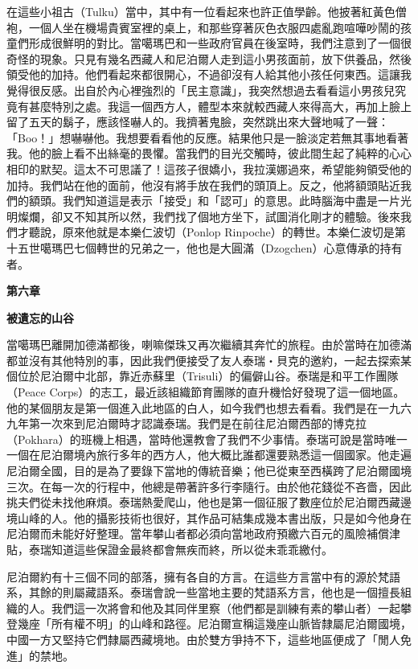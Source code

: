 在這些小祖古（Tulku）當中，其中有一位看起來也許正值學齡。他披著紅黃色僧袍，一個人坐在機場貴賓室裡的桌上，和那些穿著灰色衣服四處亂跑喧嘩吵鬧的孩童們形成很鮮明的對比。當噶瑪巴和一些政府官員在後室時，我們注意到了一個很奇怪的現象。只見有幾名西藏人和尼泊爾人走到這小男孩面前，放下供養品，然後領受他的加持。他們看起來都很開心，不過卻沒有人給其他小孩任何東西。這讓我覺得很反感。出自於內心裡強烈的「民主意識」，我突然想過去看看這小男孩兒究竟有甚麼特別之處。我這一個西方人，體型本來就較西藏人來得高大，再加上臉上留了五天的鬍子，應該怪嚇人的。我擠著鬼臉，突然跳出來大聲地喊了一聲：「Boo！」想嚇嚇他。我想要看看他的反應。結果他只是一臉淡定若無其事地看著我。他的臉上看不出絲毫的畏懼。當我們的目光交觸時，彼此間生起了純粹的心心相印的默契。這太不可思議了！這孩子很嬌小，我拉漢娜過來，希望能夠領受他的加持。我們站在他的面前，他沒有將手放在我們的頭頂上。反之，他將額頭貼近我們的額頭。我們知道這是表示「接受」和「認可」的意思。此時腦海中盡是一片光明燦爛，卻又不知其所以然，我們找了個地方坐下，試圖消化剛才的體驗。後來我們才聽說，原來他就是本樂仁波切（Ponlop
Rinpoche）的轉世。本樂仁波切是第十五世噶瑪巴七個轉世的兄弟之一，他也是大圓滿（Dzogchen）心意傳承的持有者。

\textbf{第六章}

\textbf{被遺忘的山谷}

當噶瑪巴離開加德滿都後，喇嘛傑珠又再次繼續其奔忙的旅程。由於當時在加德滿都並沒有其他特別的事，因此我們便接受了友人泰瑞‧貝克的邀約，一起去探索某個位於尼泊爾中北部，靠近赤蘇里（Trisuli）的偏僻山谷。泰瑞是和平工作團隊（Peace
Corps）的志工，最近該組織節育團隊的直升機恰好發現了這一個地區。他的某個朋友是第一個進入此地區的白人，如今我們也想去看看。我們是在一九六九年第一次來到尼泊爾時才認識泰瑞。我們是在前往尼泊爾西部的博克拉（Pokhara）的班機上相遇，當時他還教會了我們不少事情。泰瑞可說是當時唯一一個在尼泊爾境內旅行多年的西方人，他大概比誰都還要熟悉這一個國家。他走遍尼泊爾全國，目的是為了要錄下當地的傳統音樂；他已從東至西橫跨了尼泊爾國境三次。在每一次的行程中，他總是帶著許多行李隨行。由於他花錢從不吝嗇，因此挑夫們從未找他麻煩。泰瑞熱愛爬山，他也是第一個征服了數座位於尼泊爾西藏邊境山峰的人。他的攝影技術也很好，其作品可結集成幾本書出版，只是如今他身在尼泊爾而未能好好整理。當年攀山者都必須向當地政府預繳六百元的風險補償津貼，泰瑞知道這些保證金最終都會無疾而終，所以從未乖乖繳付。

尼泊爾約有十三個不同的部落，擁有各自的方言。在這些方言當中有的源於梵語系，其餘的則屬藏語系。泰瑞會說一些當地主要的梵語系方言，他也是一個擅長組織的人。我們這一次將會和他及其同伴里察（他們都是訓練有素的攀山者）一起攀登幾座「所有權不明」的山峰和路徑。尼泊爾宣稱這幾座山脈皆隸屬尼泊爾國境，中國一方又堅持它們隸屬西藏境地。由於雙方爭持不下，這些地區便成了「閒人免進」的禁地。

